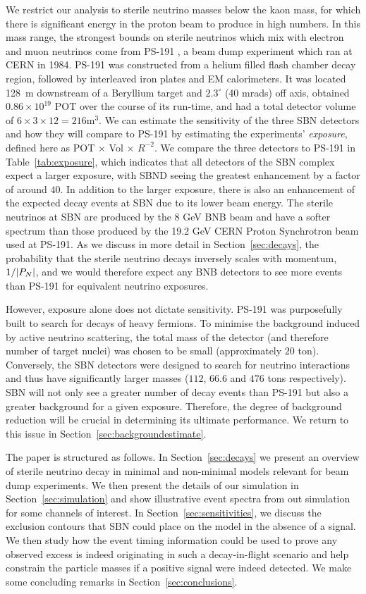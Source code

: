 \documentclass[11pt, a4paper]{article}
\newcommand{\refsec}[1]{Section~\ref{#1}}
\newcommand{\reftab}[1]{Table~\ref{#1}}
\def\ster{\ensuremath N}
\begin{document}
We restrict our analysis to sterile neutrino masses below the kaon mass, for
which there is significant energy in the proton beam to produce in high
numbers. In this mass range, the strongest bounds on sterile neutrinos which
mix with electron and muon neutrinos come from PS-191 \cite{Bernardi:1985ny,
Bernardi:1987ek}, a beam dump experiment which ran at CERN in 1984. 
%
PS-191 was constructed from a helium filled flash chamber decay region,
followed by interleaved iron plates and EM calorimeters. It was located 128~m
downstream of a Beryllium target and $2.3^\circ$ (40 mrads) off axis, obtained
$0.86 \times 10^{19}$ POT over the course of its run-time, and had a total
detector volume of $6\times3\times12 = 216 \text{m}^3$. We can estimate the
sensitivity of the three SBN detectors and how they will compare to PS-191 by
estimating the experiments' \emph{exposure}, defined here as POT $\times$ Vol
$\times$ $R^{-2}$. We compare the three detectors to PS-191 in
\reftab{tab:exposure}, which indicates that all detectors of the SBN complex
expect a larger exposure, with SBND seeing the greatest enhancement by a factor
of around $40$. 
%
In addition to the larger exposure, there is also an enhancement of the
expected decay events at SBN due to its lower beam energy. The sterile
neutrinos at SBN are produced by the 8 GeV BNB beam and have a softer spectrum
than those produced by the 19.2 GeV CERN Proton Synchrotron beam used at
PS-191. As we discuss in more detail in \refsec{sec:decays}, the probability
that the sterile neutrino decays inversely scales with momentum, $1/|P_\ster|$,
and we would therefore expect any BNB detectors to see more events than PS-191
for equivalent neutrino exposures.

However, exposure alone does not dictate sensitivity. PS-191 was purposefully
built to search for decays of heavy fermions. To minimise the background
induced by active neutrino scattering, the total mass of the detector (and
therefore number of target nuclei) was chosen to be small (approximately $20$
ton). Conversely, the SBN detectors were designed to search for neutrino
interactions and thus have significantly larger masses ($112$, $66.6$ and $476$
tons respectively). SBN will not only see a greater number of decay events than
PS-191 but also a greater background for a given exposure. Therefore, the
degree of background reduction will be crucial in determining its ultimate
performance. We return to this issue in \refsec{sec:backgroundestimate}.

The paper is structured as follows. In \refsec{sec:decays} we present an
overview of sterile neutrino decay in minimal and non-minimal models relevant
for beam dump experiments. We then present the details of our simulation in
\refsec{sec:simulation} and show illustrative event spectra from out simulation
for some channels of interest. In \refsec{sec:sensitivities}, we discuss the
exclusion contours that SBN could place on the model in the absence of a
signal. We then study how the event timing information could be used to prove
any observed excess is indeed originating in such a decay-in-flight scenario
and help constrain the particle masses if a positive signal were indeed
detected. We make some concluding remarks in \refsec{sec:conclusions}.
\end{document}
